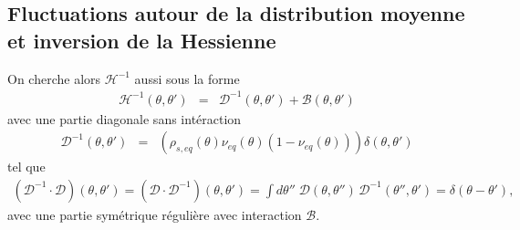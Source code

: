%
%
%
%
%
%
% 
 
 \subsection{Fluctuations autour de la distribution moyenne et inversion de la Hessienne}
 
 On cherche alors \(\mathcal{H}^{-1} \) aussi sous la forme 
\begin{eqnarray}
	\mathcal{H}^{-1}(\theta, \theta') & = & \mathcal{D}^{-1}(\theta, \theta') + \mathcal{B}(\theta, \theta') 
	\label{chap:fluctu:eq:hessienner.inv.1}	
\end{eqnarray}
avec une partie diagonale sans intéraction
\begin{eqnarray}
	\mathcal{D}^{-1}(\theta, \theta') & = & (\rho_{\! s , eq}(\theta)  \nu_{\! eq}(\theta)(1 -\nu_{\! eq}(\theta)))  \delta(\theta, \theta') 
	 \label{chap:fluctu:eq:irreg.inv}	
\end{eqnarray}
tel que 
\begin{eqnarray}
    (\mathcal{D}^{-1} \cdot  \mathcal{D})(\theta, \theta')  = (\mathcal{D}\cdot  \mathcal{D}^{-1})(\theta, \theta') =  \int d\theta'' \; \mathcal{D}(\theta, \theta'') \, \mathcal{D}^{-1}(\theta'', \theta') = \delta(\theta - \theta'),
    \label{chap:fluctu:eq:irreg.prod.inv}
\end{eqnarray}
avec une partie symétrique régulière avec interaction $\mathcal{B}$.

